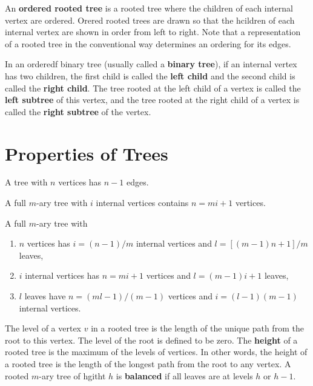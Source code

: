 \begin{definition}
An \textbf{ordered rooted tree} is a rooted tree where the children of each internal vertex are ordered. Orered rooted trees are drawn so that the hcildren of each internal vertex are shown in order from left to right. Note that a representation of a rooted tree in the conventional way determines an ordering for its edges. 

In an orderedf binary tree (usually called a \textbf{binary tree}), if an internal vertex has two children, the first child is called the \textbf{left child} and the second child is called the \textbf{right child}. The tree rooted at the left child of a vertex is called the \textbf{left subtree} of this vertex, and the tree rooted at the right child of a vertex is called the \textbf{right subtree} of the vertex. 
\end{definition}

\section{Properties of Trees}

\begin{theorem}
A tree with $n$ vertices has $n-1$ edges.
\end{theorem}

\begin{theorem}
A full $m$-ary tree with $i$ internal vertices contains $n=mi+1$ vertices.
\end{theorem}

\begin{theorem}
A full $m$-ary tree with 
\begin{enumerate}[label=(\roman*)]
  \item $n$ vertices has $i=(n-1)/m$ internal vertices and $l=[(m-1)n+1]/m$ leaves,
  \item $i$ internal vertices has $n=mi+1$ vertices and $l=(m-1)i+1$ leaves,
  \item $l$ leaves have $n=(ml-1)/(m-1)$ vertices and $i=(l-1)(m-1)$ internal vertices.
\end{enumerate}
\end{theorem}

\begin{definition}
The level of a vertex $v$ in a rooted tree is the length of the unique path from the root to this vertex. The level of the root is defined to be zero. The \textbf{height} of a rooted tree is the maximum of the levels of vertices. In other words, the height of a rooted tree is the length of the longest path from the root to any vertex. A rooted $m$-ary tree of hgitht $h$ is \textbf{balanced} if all leaves are at levels $h$ or $h-1$.
\end{definition}

